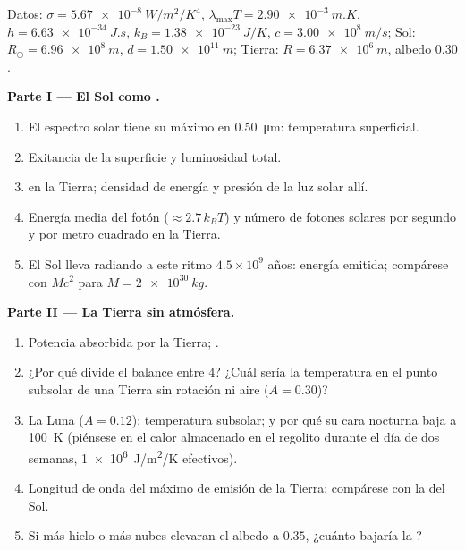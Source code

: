 \begin{problem}\label{pb:b2:thermal-radiation:1}
Datos: $\sigma = \qty{5.67e-8}{W/m^2/K^4}$, $\lambda_{\max}T = \qty{2.90e-3}{m.K}$,
$h = \qty{6.63e-34}{J.s}$, $k_B = \qty{1.38e-23}{J/K}$, $c = \qty{3.00e8}{m/s}$;
Sol: $R_\odot = \qty{6.96e8}{m}$, $d = \qty{1.50e11}{m}$; Tierra: $R =
\qty{6.37e6}{m}$, albedo $0.30$.

\textbf{Parte I --- El Sol como .}
\begin{enumerate}
  \item El espectro solar tiene su máximo en \qty{0.50}{\micro m}: temperatura
        superficial.
  \item Exitancia de la superficie y luminosidad total.
  \item {} en la Tierra; densidad de energía y presión de
        la luz solar allí.
  \item Energía media del fotón ($\approx 2.7\,k_BT$) y número de fotones
        solares por segundo y por metro cuadrado en la Tierra.
  \item El Sol lleva radiando a este ritmo $4.5 \times 10^9$ años:
        energía emitida; compárese con $Mc^2$ para $M = \qty{2e30}{kg}$.
\end{enumerate}

\textbf{Parte II --- La Tierra sin atmósfera.}
\begin{enumerate}[resume]
  \item Potencia absorbida por la Tierra; .
  \item ¿Por qué divide el balance entre $4$? ¿Cuál sería la
        temperatura en el punto subsolar de una Tierra sin rotación ni
        aire ($A = 0.30$)?
  \item La Luna ($A = 0.12$): temperatura subsolar; y por qué su cara
        nocturna baja a \qty{100}{K} (piénsese en el calor almacenado en el
        regolito durante el día de dos semanas, \qty{1e6}{J/m^2/K} efectivos).
  \item Longitud de onda del máximo de emisión de la Tierra; compárese con la
        del Sol.
  \item Si más hielo o más nubes elevaran el albedo a $0.35$, ¿cuánto
        bajaría la ?
\end{enumerate}


\end{problem}
